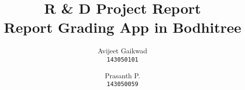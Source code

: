 \documentclass[12px,a4]{article}
\title{R \& D Project Report\\Report Grading App in Bodhitree}
\author{
  Avijeet Gaikwad\\
  \texttt{143050101}
  \and
  Prasanth P.\\
  \texttt{143050059}
}
\date{}
\begin{document}
\maketitle

\pagebreak
\tableofcontents





\pagebreak


\pagebreak


\pagebreak


\pagebreak


\pagebreak


\pagebreak


\pagebreak


\pagebreak

\end{document}
